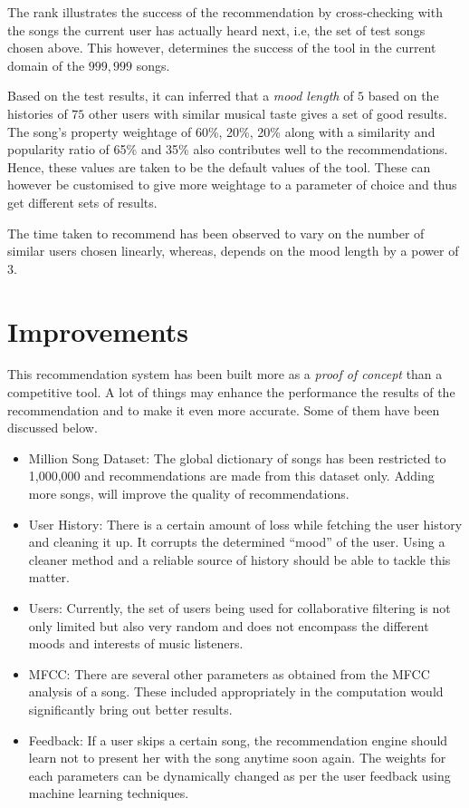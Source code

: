 		The rank illustrates the success of the recommendation by cross-checking with the songs the current user has actually heard next, i.e, the set of test songs chosen above. This however, determines the success of the tool in the current domain of the \(999,999\) songs.
		
		Based on the test results, it can inferred that a \emph{mood length} of \(5\) based on the histories of \(75\) other users with similar musical taste gives a set of good results. The song's property weightage of 60\%, 20\%, 20\% along with a similarity and popularity ratio of 65\% and 35\% also contributes well to the recommendations. Hence, these values are taken to be the default values of the tool. These can however be customised to give more weightage to a parameter of choice and thus get different sets of results.
		
		The time taken to recommend has been observed to vary on the number of similar users chosen linearly, whereas, depends on the mood length by a power of \(3\).
	
	\section{Improvements}
		This recommendation system has been built more as a \emph{proof of concept} than a competitive tool. A lot of things may enhance the performance the results of the recommendation and to make it even more accurate. Some of them have been discussed below.

 \begin{itemize}
 	\item Million Song Dataset: The global dictionary of songs has been restricted to 1,000,000 and recommendations are made from this dataset only. Adding more songs, will improve the quality of recommendations.
 	\item User History: There is a certain amount of loss while fetching the user history and cleaning it up. It corrupts the determined ``mood'' of the user. Using a cleaner method and a reliable source of history should be able to tackle this matter.
 	\item Users: Currently, the set of users being used for collaborative filtering is not only limited but also very random and does not encompass the different moods and interests of music listeners.
 	\item MFCC: There are several other parameters as obtained from the MFCC analysis of a song. These included appropriately in the computation would significantly bring out better results.
 	\item Feedback: If a user skips a certain song, the recommendation engine should learn not to present her with the song anytime soon again. The weights for each parameters can be dynamically changed as per the user feedback using machine learning techniques.
 \end{itemize} 
	
